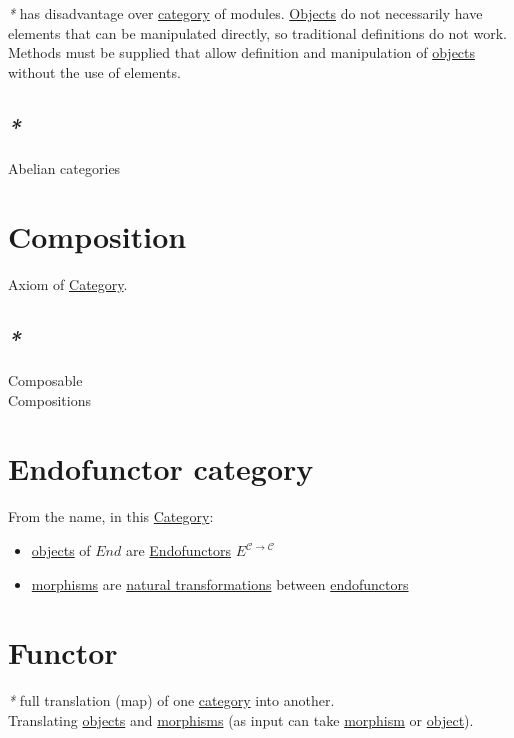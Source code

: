 \documentclass[a4paper,14pt,oneside]{book}
\begin{document}
\emph{*} has disadvantage over \hyperref[org3a5c6d7]{category} of modules. \hyperref[org67f2abd]{Objects} do not necessarily have elements that can be manipulated directly, so traditional definitions do not work. Methods must be supplied that allow definition and manipulation of \hyperref[org67f2abd]{objects} without the use of elements.\\

\subsection{\emph{*}}
\label{sec:orgdc32709}

\label{org71e0ade}Abelian categories\\

\section{\label{org309d77e}Composition}
\label{sec:org5b563b2}
Axiom of \hyperref[org3a5c6d7]{Category}.\\

\subsection{\emph{*}}
\label{sec:org1cb07e3}

\label{orgef80547}Composable\\
\label{orgf985882}Compositions\\

\section{\label{orgf60cfe6}Endofunctor category}
\label{sec:org4c792d0}
From the name, in this \hyperref[org3a5c6d7]{Category}:\\
\begin{itemize}
\item \hyperref[org67f2abd]{objects} of \(End\) are \hyperref[orgbe03043]{Endofunctors} \(E^{\mathcal{C \to C}}\)\\
\item \hyperref[orgb352465]{morphisms} are \hyperref[org8e3221d]{natural transformations} between \hyperref[orgbe03043]{endofunctors}\\
\end{itemize}

\section{\label{orgd17eb6d}Functor}
\label{sec:org263c2e9}
\emph{*} full translation (map) of one \hyperref[org3a5c6d7]{category} into another.\\
Translating \hyperref[org67f2abd]{objects} and \hyperref[orgb352465]{morphisms} (as input can take \hyperref[orgc908564]{morphism} or \hyperref[org65d2cb0]{object}).\\
\end{document}
